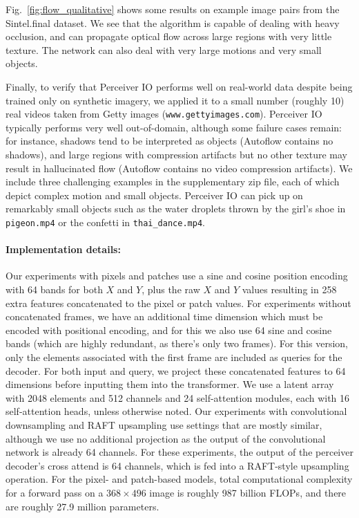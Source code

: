 \documentclass{article} %
\newcommand{\ourmodel}{Perceiver IO\xspace}
\begin{document}
Fig.~\ref{fig:flow_qualitative} shows some results on example image pairs from the Sintel.final dataset.  We see that the algorithm is capable of dealing with heavy occlusion, and can propagate optical flow across large regions with very little texture.  The network can also deal with very large motions and very small objects.
 
Finally, to verify that \ourmodel{} performs well on real-world data despite being trained only on synthetic imagery, we applied it to a small number (roughly 10) real videos taken from Getty images (\texttt{www.gettyimages.com}).  \ourmodel typically performs very well out-of-domain, although some failure cases remain: for instance, shadows tend to be interpreted as objects (Autoflow contains no shadows), and large regions with compression artifacts but no other texture may result in hallucinated flow (Autoflow contains no video compression artifacts).  We include three challenging examples in the supplementary zip file, each of which depict complex motion and small objects. Perceiver IO can pick up on remarkably small objects such as the water droplets thrown by the girl's shoe in \texttt{pigeon.mp4} or the confetti in \texttt{thai\_dance.mp4}.  

\paragraph{Implementation details:} Our experiments with pixels and patches use a sine and cosine position encoding with 64 bands for both $X$ and $Y$, plus the raw $X$ and $Y$ values resulting in 258 extra features concatenated to the pixel or patch values. For experiments without concatenated frames, we have an additional time dimension which must be encoded with positional encoding, and for this we also use 64 sine and cosine bands (which are highly redundant, as there's only two frames).  For this version, only the elements associated with the first frame are included as queries for the decoder.  For both input and query, we project these concatenated features to 64 dimensions before inputting them into the transformer. We use a latent array with 2048 elements and 512 channels and 24 self-attention modules, each with 16 self-attention heads, unless otherwise noted.  Our experiments with convolutional downsampling and RAFT upsampling use settings that are mostly similar, although we use no additional projection as the output of the convolutional network is already 64 channels. For these experiments, the output of the perceiver decoder's cross attend is 64 channels, which is fed into a RAFT-style upsampling operation.  For the pixel- and patch-based models, total computational complexity for a forward pass on a $368\times 496$ image is roughly 987 billion FLOPs, and there are roughly 27.9 million parameters. 
\end{document}
